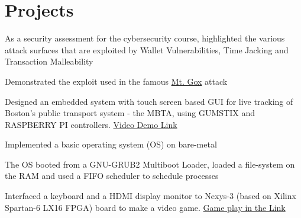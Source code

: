 \documentclass[]{deedy_format_Anmol}
\begin{document}
\begin{minipage}[t]{0.66\textwidth}

\section{Projects}
\vspace{0.5mm} %

\vspace{1mm}
\justify
\begin{tightemize}
\item As a security assessment for the cybersecurity course, highlighted the various attack surfaces that are exploited by Wallet Vulnerabilities, Time Jacking and Transaction Malleability
\item Demonstrated the exploit used in the famous \href{http://www.darkreading.com/attacks-and-breaches/mt-gox-bitcoin-meltdown-what-went-wrong/d/d-id/1114091}{Mt. Gox} attack 
\end{tightemize}
\vspace{\topsep}
\sectionsep

\vspace{1mm}
\justify
\begin{tightemize}
\item Designed an embedded system with touch screen based GUI for live tracking of Boston’s public transport system - the MBTA, using GUMSTIX and RASPBERRY PI controllers. \href{https://www.youtube.com/watch?v=DtY4qqCeVRI}{Video Demo Link}
\end{tightemize}
\vspace{\topsep}
\sectionsep

\vspace{1mm}
\justify
\begin{tightemize}
\item Implemented a basic operating system (OS) on bare-metal
\item The OS booted from a GNU-GRUB2 Multiboot Loader, loaded a file-system on the RAM and used a FIFO scheduler to schedule processes
\end{tightemize}
\vspace{\topsep}
\sectionsep

\vspace{1mm}
\justify
\begin{tightemize}
\item Interfaced a keyboard and a HDMI display monitor to Nexys-3 (based on Xilinx Spartan-6 LX16 FPGA) board to make a video game.  \href{https://youtu.be/s36H25OkzVQ}{Game play in the Link}
\end{tightemize}
\vspace{\topsep}
\sectionsep


\end{minipage}
\end{document}
